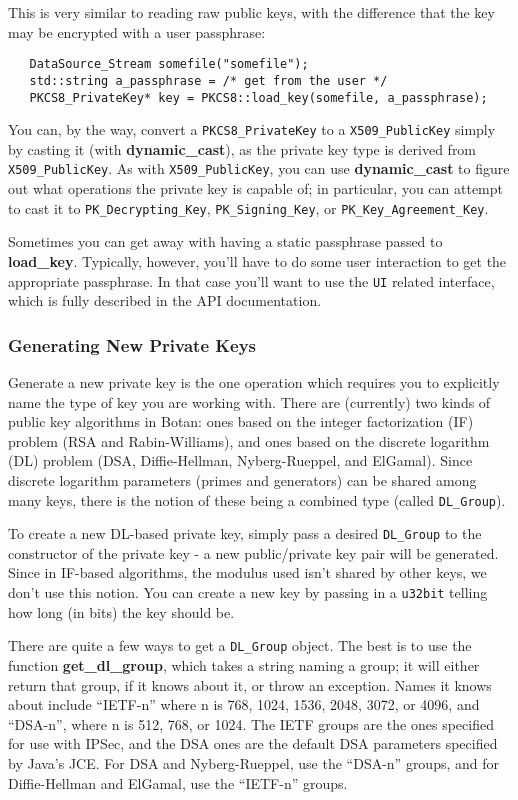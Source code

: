 \documentclass{article}
\newcommand{\function}[1]{\textbf{#1}}
\newcommand{\type}[1]{\texttt{#1}}
\begin{document}
This is very similar to reading raw public keys, with the difference that the
key may be encrypted with a user passphrase:

\begin{verbatim}
   DataSource_Stream somefile("somefile");
   std::string a_passphrase = /* get from the user */
   PKCS8_PrivateKey* key = PKCS8::load_key(somefile, a_passphrase);
\end{verbatim}

You can, by the way, convert a \type{PKCS8\_PrivateKey} to a
\type{X509\_PublicKey} simply by casting it (with \function{dynamic\_cast}), as
the private key type is derived from \type{X509\_PublicKey}. As with
\type{X509\_PublicKey}, you can use \function{dynamic\_cast} to figure out what
operations the private key is capable of; in particular, you can attempt to
cast it to \type{PK\_Decrypting\_Key}, \type{PK\_Signing\_Key}, or
\type{PK\_Key\_Agreement\_Key}.

Sometimes you can get away with having a static passphrase passed to
\function{load\_key}. Typically, however, you'll have to do some user
interaction to get the appropriate passphrase. In that case you'll want to use
the \type{UI} related interface, which is fully described in the API
documentation.

\subsubsection{Generating New Private Keys}

Generate a new private key is the one operation which requires you to
explicitly name the type of key you are working with. There are (currently) two
kinds of public key algorithms in Botan: ones based on the integer
factorization (IF) problem (RSA and Rabin-Williams), and ones based on the
discrete logarithm (DL) problem (DSA, Diffie-Hellman, Nyberg-Rueppel, and
ElGamal). Since discrete logarithm parameters (primes and generators) can be
shared among many keys, there is the notion of these being a combined type
(called \type{DL\_Group}).

To create a new DL-based private key, simply pass a desired \type{DL\_Group} to
the constructor of the private key - a new public/private key pair will be
generated. Since in IF-based algorithms, the modulus used isn't shared by other
keys, we don't use this notion. You can create a new key by passing in a
\type{u32bit} telling how long (in bits) the key should be.

There are quite a few ways to get a \type{DL\_Group} object. The best is to use
the function \function{get\_dl\_group}, which takes a string naming a group; it
will either return that group, if it knows about it, or throw an
exception. Names it knows about include ``IETF-n'' where n is 768, 1024, 1536,
2048, 3072, or 4096, and ``DSA-n'', where n is 512, 768, or 1024. The IETF
groups are the ones specified for use with IPSec, and the DSA ones are the
default DSA parameters specified by Java's JCE. For DSA and Nyberg-Rueppel, use
the ``DSA-n'' groups, and for Diffie-Hellman and ElGamal, use the ``IETF-n''
groups.
\end{document}
